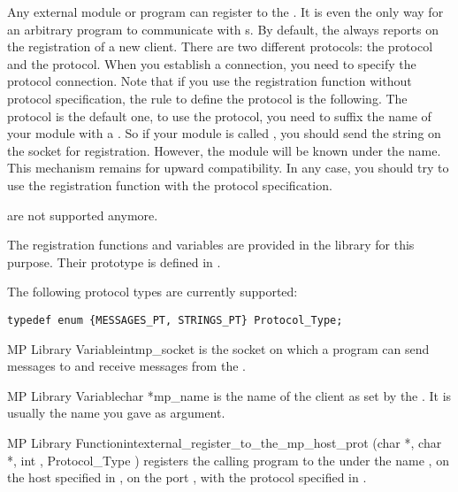 Any external module or program can register to the \MP{}. It is even the only
way for an arbitrary program to communicate with \CPK{}s. By default, the \MP{}
always reports on  the registration of a new client. There are two
different protocols: the  protocol and the 
protocol. When you establish a connection, you need to specify the protocol
connection. Note that if you use the registration function without protocol
specification, the rule to define the protocol is the following. The
 protocol is the default one, to use the 
protocol, you need to suffix the name of your module with a \samp{/}. So if
your module is called , you should send the string  on the
socket for registration. However, the module will be known under the 
name. This mechanism remains for upward compatibility. In any case, you should
try to use the registration function with the protocol specification.

are not supported anymore.

The registration functions and variables are provided in the
 library for this purpose. Their prototype is defined in
.

The following protocol types are currently supported: 
\begin{verbatim}
typedef enum {MESSAGES_PT, STRINGS_PT} Protocol_Type;
\end{verbatim}

\begin{typevr}{MP Library Variable}{int}{mp\_socket}
is the \MP{} socket on which a program can send messages to and receive
messages from the \MP{}.
\end{typevr}


\begin{typevr}{MP Library Variable}{char *}{mp\_name}
is the name of the client as set by the \MP{}. It is usually the name you gave
as argument.
\end{typevr}

\begin{typefn}{MP Library Function}{int}{external\_register\_to\_the\_mp\_host\_prot}
        {(char *, char *, int ,
Protocol\_Type )} registers the calling program to the \MP{} under the
name , on the host specified in , on the port
, with the protocol specified in .
\end{typefn}

